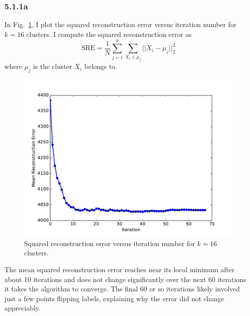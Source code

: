 \documentclass[12pt]{amsart}
\begin{document}
\subsubsection*{5.1.1a}
In Fig.~\ref{fig:k_16_rec_err}, I plot the squared reconstruction error versus iteration number for $k = 16$ clusters.  I compute the squared reconstruction error as
\begin{equation} \label{eqn:sq_rec_err}
\text{SRE} = \frac{1}{N} \sum_{j = 1}^k\sum_{X_i \in \mu_j} || X_i - \mu_j ||_2^2
\end{equation}
where $\mu_j$ is the cluster $X_i$ belongs to.
\begin{figure}[H]
	\includegraphics[width=\columnwidth]{k_16_rec_err.pdf}
    \caption{Squared reconstruction error versus iteration number for $k = 16$ clusters.}
    \label{fig:k_16_rec_err}
\end{figure}
The mean squared reconstruction error reaches near its local minimum after about 10 iterations and does not change significantly over the next 60 iterations it takes the algorithm to converge.  The final 60 or so iterations likely involved just a few points flipping labels, explaining why the error did not change appreciably.
\end{document}
